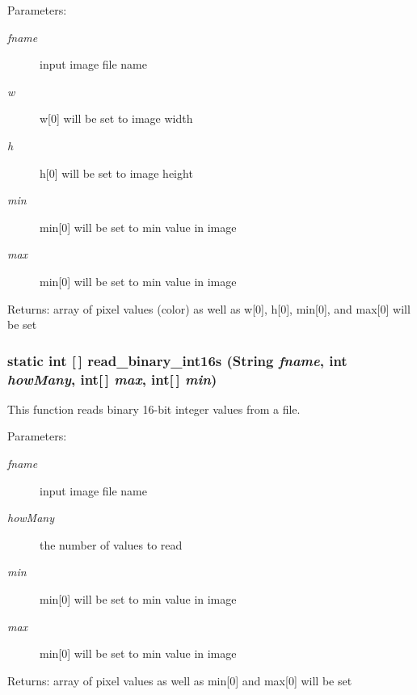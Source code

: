 \begin{Desc}
\item[Parameters:]
\begin{description}
\item[{\em fname}]input image file name \item[{\em w}]w[0] will be set to image width \item[{\em h}]h[0] will be set to image height \item[{\em min}]min[0] will be set to min value in image \item[{\em max}]min[0] will be set to min value in image\end{description}
\end{Desc}
\begin{Desc}
\item[Returns:]array of pixel values (color) as well as w[0], h[0], min[0], and max[0] will be set \end{Desc}
\subsubsection{\setlength{\rightskip}{0pt plus 5cm}static int [$\,$] read\_\-binary\_\-int16s (String {\em fname}, int {\em how\-Many}, int[$\,$] {\em max}, int[$\,$] {\em min})\hspace{0.3cm}{\tt  [static, protected]}}\label{class_c_s_image_viewer_1_1pnm_helper_020e23c75bdf1f776395119067076565}


This function reads binary 16-bit integer values from a file. 

\begin{Desc}
\item[Parameters:]
\begin{description}
\item[{\em fname}]input image file name \item[{\em how\-Many}]the number of values to read \item[{\em min}]min[0] will be set to min value in image \item[{\em max}]min[0] will be set to min value in image\end{description}
\end{Desc}
\begin{Desc}
\item[Returns:]array of pixel values as well as min[0] and max[0] will be set \end{Desc}
